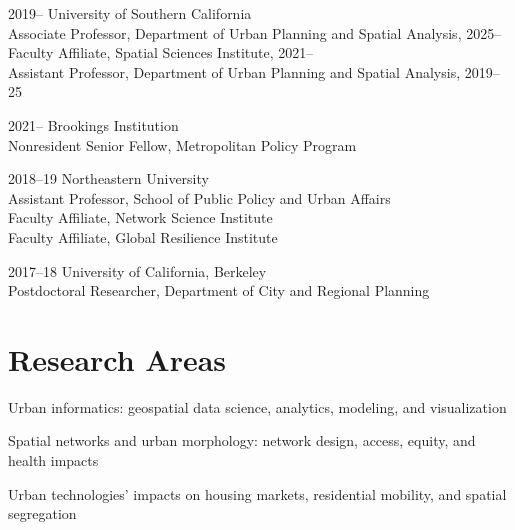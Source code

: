 \documentclass[11pt,letterpaper]{report} %
\newcommand{\listitemspace}{0.25em}
\renewenvironment{itemize}
{\begin{list}{}{\setlength{\leftmargin}{0em}
                \setlength{\parskip}{0em}
                \setlength{\itemsep}{\listitemspace}
                \setlength{\parsep}{\listitemspace}}}
{\end{list}}
\begin{document}
    \begin{tablist}

        \item[2019--]   \tab{}University of Southern California \\
                              Associate Professor, Department of Urban Planning and Spatial Analysis, 2025-- \\
                              Faculty Affiliate, Spatial Sciences Institute, 2021-- \\
                              Assistant Professor, Department of Urban Planning and Spatial Analysis, 2019--25 \\

        \item[2021--]   \tab{}Brookings Institution \\
                              Nonresident Senior Fellow, Metropolitan Policy Program \\

        \item[2018--19] \tab{}Northeastern University \\
                              Assistant Professor, School of Public Policy and Urban Affairs \\
                              Faculty Affiliate, Network Science Institute \\
                              Faculty Affiliate, Global Resilience Institute

        \item[2017--18] \tab{}University of California, Berkeley \\
                              Postdoctoral Researcher, Department of City and Regional Planning

    \end{tablist}



    \section*{Research Areas}

    \begin{itemize}

        \item Urban informatics: geospatial data science, analytics, modeling, and visualization
        \item Spatial networks and urban morphology: network design, access, equity, and health impacts
        \item Urban technologies' impacts on housing markets, residential mobility, and spatial segregation

    \end{itemize}
\end{document}
